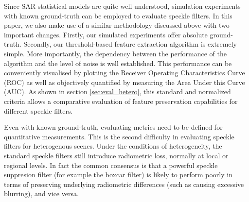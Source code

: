 \documentclass[journal]{IEEEtran}
\begin{document}
Since SAR statistical models are quite well understood, 
	simulation experiments with known ground-truth can be employed 
		to evaluate speckle filters.
In this paper, we also make use of a similar methodology discussed above with two important changes.
Firstly, our simulated experiments offer absolute ground-truth.
Secondly, our threshold-based feature extraction algorithm is extremely simple.
More importantly, the dependency between the performance of the algorithm and the level of noise is well established. 
This performance can be 
	conveniently visualised by plotting the Receiver Operating Characteristics Curve (ROC) 
	as well as objectively quantified by measuring the Area Under this Curve (AUC). 
As shown in section \ref{sec:eval_hetero}, this standard and normalized criteria allows a comparative evaluation of feature preservation capabilities for different speckle filters.

%

Even with known ground-truth, evaluating metrics need to be defined for quantitative measurements.
This is the second difficulty in evaluating speckle filters for heterogenous scenes.
Under the conditions of heterogeneity, the standard speckle filters still introduce radiometric loss, normally at local or regional levels.
In fact the common consensus is that a powerful speckle suppresion filter (for example the boxcar filter) is likely to perform poorly in terms of preserving underlying radiometric differences (such as causing excessive blurring), and vice versa. 
\end{document}

